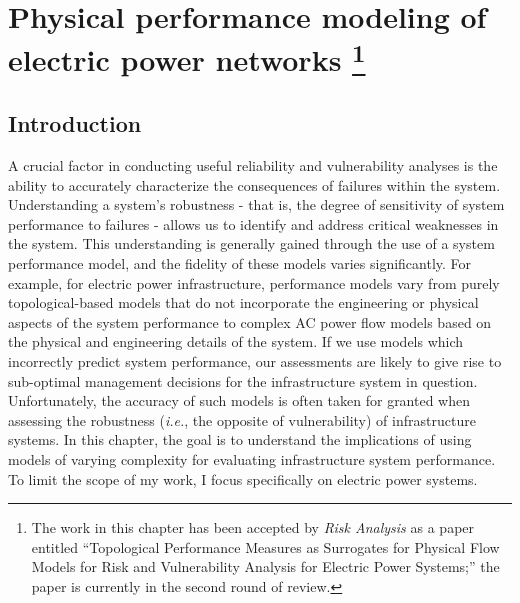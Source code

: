
\chapter[Physical performance modeling of electric power networks]{Physical performance modeling of electric power networks \footnote[5]{The work in this chapter has been accepted by \emph{Risk Analysis} as a paper entitled ``Topological Performance Measures as Surrogates for Physical Flow Models for Risk and Vulnerability Analysis for Electric Power Systems;''\cite{LaRocca2014b} the paper is currently in the second round of review.}}
\label{ch3}


\section{Introduction}
\label{sec:ch3:intro}

A crucial factor in conducting useful reliability and vulnerability analyses is the ability to accurately characterize the consequences of failures within the system.  Understanding a system's robustness - that is, the degree of sensitivity of system performance to failures - allows us to identify and address critical weaknesses in the system.  This understanding is generally gained through the use of a system performance model, and the fidelity of these models varies significantly. For example, for electric power infrastructure, performance models vary from purely topological-based models that do not incorporate the engineering or physical aspects of the system performance to complex AC power flow models based on the physical and engineering details of the system. If we use models which incorrectly predict system performance, our assessments are likely to give rise to sub-optimal management decisions for the infrastructure system in question.  Unfortunately, the accuracy of such models is often taken for granted when assessing the robustness (\emph{i.e.}, the opposite of vulnerability) of infrastructure systems.  In this chapter, the goal is to understand the implications of using models of varying complexity for evaluating infrastructure system performance.  To limit the scope of my work, I focus specifically on electric power systems.
 
